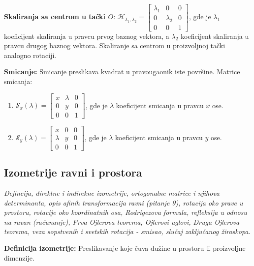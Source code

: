 \documentclass[12pt]{article}
\begin{document}
\textbf{Skaliranja sa centrom u tački $O$}:
$\mathcal{H}_{\lambda_1,\lambda_2}=\begin{bmatrix}
        \lambda_1 & 0         & 0 \\
        0         & \lambda_2 & 0 \\
        0         & 0         & 1
    \end{bmatrix}$, gde je $\lambda_1$ koeficijent skaliranja u pravcu
prvog baznog vektora, a $\lambda_2$ koeficijent skaliranja u pravcu
drugog baznog vektora. Skaliranje sa centrom u proizvoljnoj tački analogno
rotaciji.
\par

\textbf{Smicanje:} Smicanje preslikava kvadrat u pravougaonik iste površine.
Matrice smicanja:
\begin{enumerate}[label=]
    \item $\mathcal{S}_x(\lambda)=\begin{bmatrix}
                  x & \lambda & 0 \\
                  0 & y       & 0 \\
                  0 & 0       & 1
              \end{bmatrix}$, gde je $\lambda$ koeficijent smicanja u pravcu $x$ ose.
    \item $\mathcal{S}_y(\lambda)=\begin{bmatrix}
                  x       & 0 & 0 \\
                  \lambda & y & 0 \\
                  0       & 0 & 1
              \end{bmatrix}$, gde je $\lambda$ koeficijent smicanja u pravcu $y$ ose.
\end{enumerate}

\subsection{Izometrije ravni i prostora}
\textit{Defincija, direktne i indirekne izometrije, ortogonalne matrice i
    njihova determinanta, opis afinih transformacija ravni (pitanje 9), rotacija
    oko prave u prostoru, rotacije oko koordinatnih osa, Rodrigezova formula,
    refleksija u odnosu na ravan (računanje), Prva Ojlerova teorema, Ojlerovi
    uglovi, Druga Ojlerova teorema, veza sopstvenih i svetskih rotacija - smisao,
    slučaj zaključanog žiroskopa.}
\par
\vspace*{1cm}

\textbf{Definicija izometrije:} Preslikavanje koje čuva dužine u prostoru
$\mathbb{E}$ proizvoljne dimenzije.
\par
\end{document}
